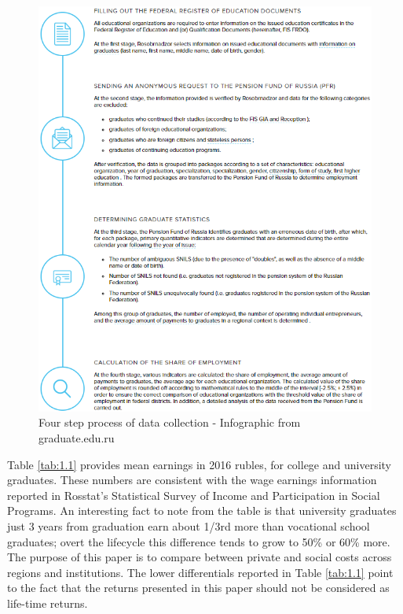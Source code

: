 \documentclass[alpha-refs]{wiley-article-05g}
\begin{document}
\begin{center}
	\begin{figure}[htbp!]
\begin{minipage}[b]{1\linewidth}
			\centering
			\hspace*{-0.2in}
         \includegraphics[scale=0.88, frame]{gedu_cap1b.png}
		\end{minipage}
			\caption{Four step process of data collection - Infographic from graduate.edu.ru}\label{fig:1.1}
	\end{figure}
\end{center}

\vspace{-0.35in}

Table \ref{tab:1.1} provides mean earnings in 2016 rubles, for college and university graduates. These numbers are consistent with the wage earnings information reported in Rosstat's Statistical Survey of Income and Participation in Social Programs. An interesting fact to note from the table is that university graduates just 3 years from graduation earn about 1/3rd more than vocational school graduates; overt the lifecycle this difference tends to grow to 50\% or 60\% more. The purpose of this paper is to compare between private and social costs across regions and institutions. The lower differentials reported in Table \ref{tab:1.1} point to the fact that the returns presented in this paper should not be considered as life-time returns. 
\end{document}
